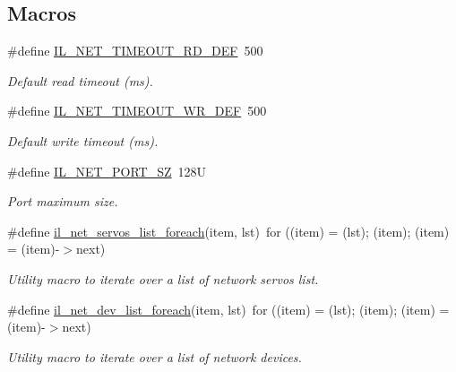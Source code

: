 \subsection*{Macros}
\begin{DoxyCompactItemize}
\item 
\#define \hyperlink{group__IL__NET_ga7fb88a9dcbf2c6ae143dc9d16c70ad4f}{I\+L\+\_\+\+N\+E\+T\+\_\+\+T\+I\+M\+E\+O\+U\+T\+\_\+\+R\+D\+\_\+\+D\+EF}~500
\begin{DoxyCompactList}\small\item\em Default read timeout (ms). \end{DoxyCompactList}\item 
\#define \hyperlink{group__IL__NET_gaf43b0714cfed3be5907c593e18d4481d}{I\+L\+\_\+\+N\+E\+T\+\_\+\+T\+I\+M\+E\+O\+U\+T\+\_\+\+W\+R\+\_\+\+D\+EF}~500
\begin{DoxyCompactList}\small\item\em Default write timeout (ms). \end{DoxyCompactList}\item 
\#define \hyperlink{group__IL__NET_ga9c33d1c3bf660e4cb980a9e7a676cb88}{I\+L\+\_\+\+N\+E\+T\+\_\+\+P\+O\+R\+T\+\_\+\+SZ}~128U
\begin{DoxyCompactList}\small\item\em Port maximum size. \end{DoxyCompactList}\item 
\#define \hyperlink{group__IL__NET_ga70cbad080864d1cc39dd701f9a27d9b6}{il\+\_\+net\+\_\+servos\+\_\+list\+\_\+foreach}(item,  lst)~for ((item) = (lst); (item); (item) = (item)-\/$>$next)
\begin{DoxyCompactList}\small\item\em Utility macro to iterate over a list of network servos list. \end{DoxyCompactList}\item 
\#define \hyperlink{group__IL__NET_gae80aefde62011dd14dbf60840669cc54}{il\+\_\+net\+\_\+dev\+\_\+list\+\_\+foreach}(item,  lst)~for ((item) = (lst); (item); (item) = (item)-\/$>$next)
\begin{DoxyCompactList}\small\item\em Utility macro to iterate over a list of network devices. \end{DoxyCompactList}\end{DoxyCompactItemize}
